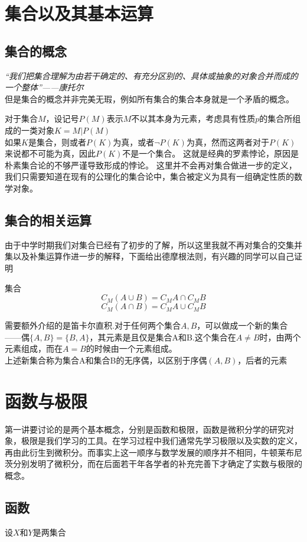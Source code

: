 \section{集合以及其基本运算}
\subsection{集合的概念}
{\large\textit{“我们把集合理解为由若干确定的、有充分区别的、具体或抽象的对象合并而成的一个整体”——康托尔}}\\


但是集合的概念并非完美无瑕，例如所有集合的集合本身就是一个矛盾的概念。

对于集合$M$，设记号$P(M)$表示$M$不以其本身为元素，考虑具有性质$p$的集合所组成的一类对象$K={M|P(M)}$\\
如果$K$是集合，则或者$P(K)$为真，或者$\neg P(K)$为真，然而这两者对于$P(K)$来说都不可能为真，因此$P(K)$不是一个集合。
这就是经典的罗素悖论，原因是朴素集合论的不够严谨导致形成的悖论。
这里并不会再对集合做进一步的定义，我们只需要知道在现有的公理化的集合论中，集合被定义为具有一组确定性质的数学对象。
\subsection{集合的相关运算}
由于中学时期我们对集合已经有了初步的了解，所以这里我就不再对集合的交集并集以及补集运算作进一步的解释，下面给出德摩根法则，有兴趣的同学可以自己证明
\begin{definition}{集合}{}
		\[C_M(A\cup   B)=C_MA\cap C_MB \]
        \[C_M(A\cap B)=C_MA\cup C_MB \]
	\end{definition}%
需要额外介绍的是笛卡尔直积.对于任何两个集合$A,B$，可以做成一个新的集合——偶$\{A,B\}=\{B,A\}$，其元素是且仅是集合A和B.这个集合在$A\neq B$时，由两个元素组成，而在$A=B$的时候由一个元素组成。\\

上述新集合称为集合A和集合B的无序偶，以区别于序偶$(A,B)$，后者的元素

\section{函数与极限}
第一讲要讨论的是两个基本概念，分别是函数和极限，函数是微积分学的研究对象，极限是我们学习的工具。在学习过程中我们通常先学习极限以及实数的定义，再由此衍生到微积分。而事实上这一顺序与数学发展的顺序并不相同，牛顿莱布尼茨分别发明了微积分，而在后面若干年各学者的补充完善下才确定了实数与极限的概念。
\subsection{函数}
设$X$和$Y$是两集合

